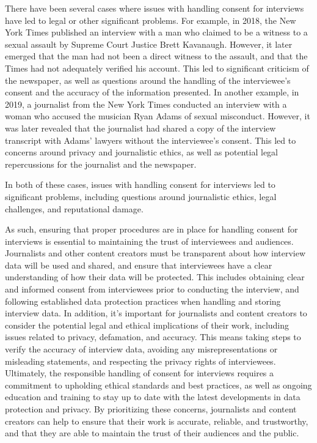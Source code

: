 \documentclass[target=mst,aauheader=]{thud}
\begin{document}
There have been several cases where issues with handling consent for interviews have led to legal or other significant problems. For example, in 2018, the New York Times published an interview with a man who claimed to be a witness to a sexual assault by Supreme Court Justice Brett Kavanaugh\cite{accusationBrettKavanaugh}. However, it later emerged that the man had not been a direct witness to the assault, and that the Times had not adequately verified his account. This led to significant criticism of the newspaper, as well as questions around the handling of the interviewee's consent and the accuracy of the information presented.
In another example, in 2019, a journalist from the New York Times conducted an interview with a woman who accused the musician Ryan Adams of sexual misconduct\cite{accusationRyanAdams}. However, it was later revealed that the journalist had shared a copy of the interview transcript with Adams' lawyers without the interviewee's consent. This led to concerns around privacy and journalistic ethics, as well as potential legal repercussions for the journalist and the newspaper.\par
In both of these cases, issues with handling consent for interviews led to significant problems, including questions around journalistic ethics, legal challenges, and reputational damage.\par
As such, ensuring that proper procedures are in place for handling consent for interviews is essential to maintaining the trust of interviewees and audiences. Journalists and other content creators must be transparent about how interview data will be used and shared, and ensure that interviewees have a clear understanding of how their data will be protected. This includes obtaining clear and informed consent from interviewees prior to conducting the interview, and following established data protection practices when handling and storing interview data.
In addition, it's important for journalists and content creators to consider the potential legal and ethical implications of their work, including issues related to privacy, defamation, and accuracy. This means taking steps to verify the accuracy of interview data, avoiding any misrepresentations or misleading statements, and respecting the privacy rights of interviewees.
Ultimately, the responsible handling of consent for interviews requires a commitment to upholding ethical standards and best practices, as well as ongoing education and training to stay up to date with the latest developments in data protection and privacy. By prioritizing these concerns, journalists and content creators can help to ensure that their work is accurate, reliable, and trustworthy, and that they are able to maintain the trust of their audiences and the public.
\end{document}
